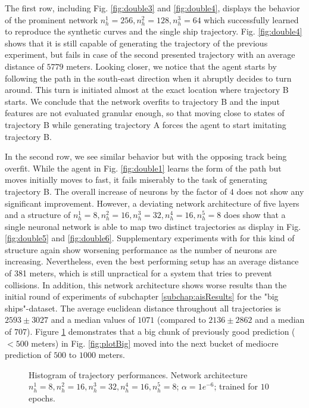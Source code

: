 The first row, including Fig. \ref{fig:double3} and \ref{fig:double4}, displays the behavior of the prominent network $n_h^1=256, n_h^2=128, n_h^3=64$ which successfully learned to reproduce the synthetic curves and the single ship trajectory. Fig. \ref{fig:double4} shows that it is still capable of generating the trajectory of the previous experiment, but fails in case of the second presented trajectory with an average distance of $5779$ meters. Looking closer, we notice that the agent starts by following the path in the south-east direction when it abruptly decides to turn around. This turn is initiated almost at the exact location where trajectory B starts. We conclude that the network overfits to trajectory B and the input features are not evaluated granular enough, so that moving close to states of trajectory B while generating trajectory A forces the agent to start imitating trajectory B.
\par
In the second row, we see similar behavior but with the opposing track being overfit. While the agent in Fig. \ref{fig:double1} learns the form of the path but moves initially moves to fast, it fails miserably to the task of generating trajectory B. The overall increase of neurons by the factor of $4$ does not show any significant improvement. However, a deviating network architecture of five layers and a structure of $n_h^1=8, n_h^2=16, n_h^3=32, n_h^4=16, n_h^5=8$ does show that a single neuronal network is able to map two distinct trajectories as display in Fig. \ref{fig:double5} and \ref{fig:double6}. Supplementary experiments with for this kind of structure again show worsening performance as the number of neurons are increasing. Nevertheless, even the best performing setup has an average distance of 381 meters, which is still unpractical for a system that tries to prevent collisions. In addition, this network architecture shows worse results than the initial round of experiments of subchapter \ref{subchap:aisResults} for the "big ships"-dataset. The average euclidean distance throughout all trajectories is $2593 \pm 3027$ and a median values of $1071$ (compared to $2136 \pm 2862$ and a median of $707$). Figure \ref{fig:finalBarPlot} demonstrates that a big chunk of previously good prediction ($<500$ meters) in Fig. \ref{fig:plotBig} moved into the next bucket of mediocre prediction of $500$ to $1000$ meters. 
\begin{figure}[H]
    \centering
    
    \caption{Histogram of trajectory performances. Network architecture $n_h^1=8, n_h^2=16, n_h^3=32, n_h^4=16, n_h^5=8$; $\alpha=1e^{-6}$; trained for $10$ epochs.}
    \label{fig:finalBarPlot}
\end{figure}

